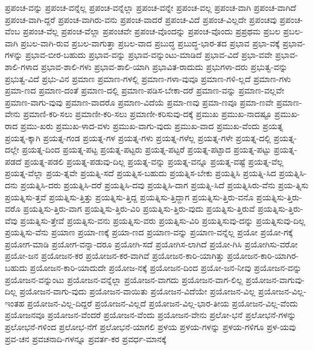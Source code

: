 {ಪ್ರಪಂಚ-ವನ್ನು
ಪ್ರಪಂಚ-ವನ್ನೆಲ್ಲ
ಪ್ರಪಂಚ-ವನ್ನೆಲ್ಲಾ
ಪ್ರಪಂಚ-ವನ್ನೇ
ಪ್ರಪಂಚ-ವಲ್ಲ
ಪ್ರಪಂಚ-ವಾಗಿ
ಪ್ರಪಂಚ-ವಾಗಿದೆ
ಪ್ರಪಂಚ-ವಾಗಿ-ದ್ದರೆ
ಪ್ರಪಂಚ-ವಾಗಿರು-ವನು
ಪ್ರಪಂಚ-ವಾದರೆ
ಪ್ರಪಂಚ-ವಿದೆ
ಪ್ರಪಂಚ-ವಿಲ್ಲದೇ
ಪ್ರಪಂಚವು
ಪ್ರಪಂಚ-ವೆಂಬ
ಪ್ರಪಂಚ-ವೆಲ್ಲ
ಪ್ರಪಂಚ-ವೆಲ್ಲಾ
ಪ್ರಪಂಚವೇ
ಪ್ರಪಂಚ-ವೊಂದನ್ನು
ಪ್ರಪಂಚ-ವೊಂದು
ಪ್ರಪ್ರಥಮ
ಪ್ರಬಲ
ಪ್ರಬಲ-ವಾಗಿ
ಪ್ರಬಲ-ವಾಗಿ-ರುವ
ಪ್ರಬಲ-ವಾಗುತ್ತಾ
ಪ್ರಬಲ-ವಾದ
ಪ್ರಬುದ್ಧ
ಪ್ರಬುದ್ಧ-ಭಾರ-ತದ
ಪ್ರಭಾವ
ಪ್ರಭಾ-ವಕ್ಕೆ
ಪ್ರಭಾವ-ಗಳನ್ನು
ಪ್ರಭಾವ-ಬೀರ-ಬಹುದು
ಪ್ರಭಾವ-ವನ್ನು
ಪ್ರಭಾವ-ವನ್ನುಂಟು-ಮಾಡಿದೆ
ಪ್ರಭಾವ-ವಿದೆ
ಪ್ರಭಾ-ವವೇ
ಪ್ರಭಾವ-ಶಾಲಿ-ಗಳಾದ
ಪ್ರಭಾವ-ಶಾಲಿ-ಗಳು
ಪ್ರಭಾವ-ಶಾಲಿ-ಯಾಗಿ
ಪ್ರಭಾವಿತ-ರಾದುದು
ಪ್ರಭುಗಳಾ-ದರು
ಪ್ರಭುತ್ವ-ವನ್ನು
ಪ್ರಭುತ್ವ-ವಿದೆ
ಪ್ರಭು-ವಿನ
ಪ್ರಮಾಣ
ಪ್ರಮಾಣ-ಗಳಲ್ಲಿ
ಪ್ರಮಾಣ-ಗಳಾ-ವುವೂ
ಪ್ರಮಾಣ-ಗಳಿ-ಲ್ಲದೆ
ಪ್ರಮಾಣ-ಗಳು
ಪ್ರಮಾ-ಣದ
ಪ್ರಮಾಣ-ದಂತೆ
ಪ್ರಮಾಣ-ದಲ್ಲಿ
ಪ್ರಮಾಣ-ಪಡಿಸ-ಬೇಕಾ-ದರೆ
ಪ್ರಮಾಣ-ವನ್ನು
ಪ್ರಮಾಣ-ವಲ್ಲವೇ
ಪ್ರಮಾಣ-ವಾಗು-ವುವು
ಪ್ರಮಾಣ-ವಾದರೊ
ಪ್ರಮಾಣ-ವಿದೆಯೆ
ಪ್ರಮಾ-ಣವು
ಪ್ರಮಾ-ಣವೂ
ಪ್ರಮಾ-ಣವೇ
ಪ್ರಮಾಣ-ವೇನು
ಪ್ರಮಾಣಿ-ಕರಿ-ಸಲು
ಪ್ರಮಾಣೀ-ಕರಿ-ಸಲು
ಪ್ರಮಾಣೀ-ಕರಿಸುವು-ದಕ್ಕೆ
ಪ್ರಮುಖ
ಪ್ರಮುಖ-ನಾದಷ್ಟೂ
ಪ್ರಮುಖ-ರಾದ
ಪ್ರಮು-ಖರು
ಪ್ರಮುಖ-ಳಾದ-ವಳು
ಪ್ರಮುಖ-ವಾಗು-ವುದು
ಪ್ರಮುಖ-ವಾದ
ಪ್ರಮುಖ-ವೆಂದು
ಪ್ರಯತ್ನ
ಪ್ರಯತ್ನ-ಕ್ಕಾಗಿ
ಪ್ರಯತ್ನ-ಗಂಡ
ಪ್ರಯತ್ನ-ಗಳ
ಪ್ರಯತ್ನ-ಗಳು
ಪ್ರಯತ್ನ-ಗಳೆಲ್ಲ
ಪ್ರಯತ್ನ-ಗಳೇ
ಪ್ರಯತ್ನ-ದಲ್ಲಿ
ಪ್ರಯತ್ನ-ದಲ್ಲೇ
ಪ್ರಯತ್ನ-ದಿಂದ
ಪ್ರಯತ್ನ-ಪಟ್ಟ
ಪ್ರಯತ್ನ-ಪಟ್ಟರು
ಪ್ರಯತ್ನ-ಪಟ್ಟರೆ
ಪ್ರಯತ್ನ-ಪಟ್ಟಾದ
ಪ್ರಯತ್ನ-ಪಟ್ಟು
ಪ್ರಯತ್ನ-ಪಡದೆ
ಪ್ರಯತ್ನ-ಪಡಲಿ
ಪ್ರಯತ್ನ-ಪಡುವು-ದಿಲ್ಲ
ಪ್ರಯತ್ನ-ವನ್ನು
ಪ್ರಯತ್ನ-ವನ್ನೂ
ಪ್ರಯತ್ನ-ವಷ್ಟೆ
ಪ್ರಯತ್ನ-ವೆಲ್ಲ
ಪ್ರಯತ್ನ-ವೆಲ್ಲಾ
ಪ್ರಯ-ತ್ನವೇ
ಪ್ರಯತ್ನಿ-ಸದೆ
ಪ್ರಯತ್ನಿಸ-ಬಹುದು
ಪ್ರಯತ್ನಿಸ-ಬೇಕು
ಪ್ರಯತ್ನಿಸಿ
ಪ್ರಯತ್ನಿ-ಸಿದ
ಪ್ರಯತ್ನಿಸಿ-ದನು
ಪ್ರಯತ್ನಿಸಿ-ದರು
ಪ್ರಯತ್ನಿಸಿ-ದರೆ
ಪ್ರಯತ್ನಿಸಿ-ದವು
ಪ್ರಯತ್ನಿಸಿ-ದಾಗ
ಪ್ರಯತ್ನಿ-ಸಿದೆ
ಪ್ರಯತ್ನಿಸಿರು-ವೆನು
ಪ್ರಯ-ತ್ನಿಸು
ಪ್ರಯತ್ನಿಸು-ತ್ತವೆ
ಪ್ರಯತ್ನಿಸು-ತ್ತಿತ್ತು
ಪ್ರಯತ್ನಿಸು-ತ್ತಿದ್ದ
ಪ್ರಯತ್ನಿಸು-ತ್ತಿದ್ದಾಗ
ಪ್ರಯತ್ನಿಸು-ತ್ತಿರು-ವನೊ
ಪ್ರಯತ್ನಿಸು-ತ್ತಿರು-ವರೊ
ಪ್ರಯತ್ನಿಸು-ತ್ತಿರು-ವಾಗ
ಪ್ರಯತ್ನಿಸು-ತ್ತಿರು-ವಿರಿ
ಪ್ರಯತ್ನಿಸು-ತ್ತಿರು-ವುದು
ಪ್ರಯತ್ನಿಸು-ತ್ತಿರುವೆ
ಪ್ರಯತ್ನಿಸು-ತ್ತಿರು-ವೆವು
ಪ್ರಯತ್ನಿಸು-ತ್ತೇವೆ
ಪ್ರಯತ್ನಿಸು-ವನು
ಪ್ರಯತ್ನಿಸು-ವರು
ಪ್ರಯತ್ನಿಸು-ವಿರಿ
ಪ್ರಯತ್ನಿಸುವು-ದನ್ನು
ಪ್ರಯತ್ನಿಸುವು-ದಿಲ್ಲ
ಪ್ರಯತ್ನಿಸು-ವೆನು
ಪ್ರಯಾಣ
ಪ್ರಯಾ-ಣಕ್ಕೆ
ಪ್ರಯಾ-ಣದ
ಪ್ರಯಾಣ-ವನ್ನು
ಪ್ರಯಾಣ-ವನ್ನೆಲ್ಲ
ಪ್ರಯೋ
ಪ್ರಯೋ-ಗಕ್ಕೆ
ಪ್ರಯೋಗ-ಮಾಡಿ
ಪ್ರಯೋಗ-ವನ್ನಾ-ದರೂ
ಪ್ರಯೋಗಿ-ಸದೆ
ಪ್ರಯೋಗಿಸ-ಲಾಗಿದೆ
ಪ್ರಯೋ-ಗಿಸಿ
ಪ್ರಯೋಗಿಸು-ವರೋ
ಪ್ರಯೋ-ಜನ
ಪ್ರಯೋಜನ-ಕರ
ಪ್ರಯೋಜನ-ಕರ-ವಾಗಿವೆ
ಪ್ರಯೋಜನ-ಕಾರಿ-ಯಾಗಿತ್ತು
ಪ್ರಯೋಜನ-ಕಾರಿ-ಯಾಗಿರ-ಬಹುದು
ಪ್ರಯೋಜನ-ಕಾರಿ-ಯಾದುದೇ
ಪ್ರಯೋಜ-ನಕ್ಕೆ
ಪ್ರಯೋಜನ-ದಿಂದ
ಪ್ರಯೋ-ಜನ-ನೀವು
ಪ್ರಯೋಜನ-ವನ್ನು
ಪ್ರಯೋಜನ-ವನ್ನುಂಟು
ಪ್ರಯೋಜನ-ವನ್ನೆಲ್ಲಾ
ಪ್ರಯೋಜನ-ವಾಗದು
ಪ್ರಯೋಜನ-ವಾಗ-ಲಿಲ್ಲ
ಪ್ರಯೋಜನ-ವಾಗುವು-ದಿಲ್ಲ
ಪ್ರಯೋಜನ-ವಾಗು-ವುದು
ಪ್ರಯೋಜನ-ವಾಯಿತು
ಪ್ರಯೋಜನ-ವಿದೆಯೇ
ಪ್ರಯೋಜನ-ವಿಲ್ಲ
ಪ್ರಯೋಜನ-ವಿಲ್ಲ-ಇಂತಹ
ಪ್ರಯೋಜನ-ವಿಲ್ಲ-ದಿದ್ದರೆ
ಪ್ರಯೋಜನ-ವಿಲ್ಲದೆ
ಪ್ರಯೋಜನ-ವಿಲ್ಲ-ಭಾರ-ತೀಯ
ಪ್ರಯೋಜನ-ವಿಲ್ಲ-ವೆಂದು
ಪ್ರಯೋಜನವೂ
ಪ್ರಯೋಜನ-ವೆಂದರೆ
ಪ್ರಯೋಜನ-ವೆಂದು
ಪ್ರಯೋಜನ-ವೇನು
ಪ್ರಲೋ-ಭನೆ
ಪ್ರಲೋಭನೆ-ಗಳನ್ನು
ಪ್ರಲೋಭನೆ-ಗಳಿಂದ
ಪ್ರಲೋಭ-ನೆಗೆ
ಪ್ರಲೋಭನೆ-ಯಾಗಲಿ
ಪ್ರಳಯ
ಪ್ರಳಯ-ಗಳನ್ನು
ಪ್ರಳಯ-ಗಳಿಗೂ
ಪ್ರಳ-ಯವು
ಪ್ರವ-ಚನ
ಪ್ರವಚನಾದಿ-ಗಳನ್ನೂ
ಪ್ರವರ್ತ-ಕರ
ಪ್ರವರ್ಧ-ಮಾನಕ್ಕೆ
}
